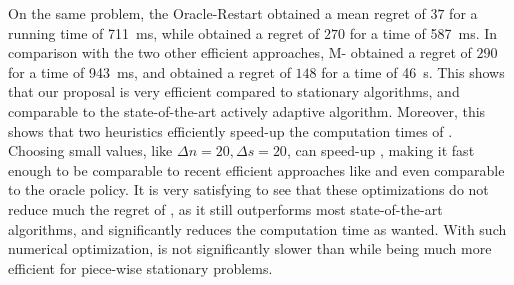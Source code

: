 On the same problem,
the Oracle-Restart \klUCB{} obtained a mean regret of $37$ for a running time of \SI{711}{\milli\second},
while \klUCB{} obtained a regret of $270$ for a time of \SI{587}{\milli\second}.
In comparison with the two other efficient approaches, M-\klUCB{} obtained a regret of $290$ for a time of \SI{943}{\milli\second},
and \CUSUMklUCB{} obtained a regret of $148$ for a time of \SI{46}{\second}.
%
This shows that our proposal is very efficient compared to stationary algorithms, and comparable to the state-of-the-art actively adaptive algorithm.
Moreover, this shows that two heuristics efficiently speed-up the computation times of \GLRklUCB.
Choosing small values, like $\Delta n = 20, \Delta s = 20$, can speed-up \GLRklUCB, making it fast enough to be comparable to recent efficient approaches like \MUCB{} and even comparable to the oracle policy.
%
It is very satisfying to see that these optimizations do not reduce much the regret of \GLRklUCB, as it still outperforms most state-of-the-art algorithms, and significantly reduces the computation time as wanted.
With such numerical optimization, \GLRklUCB{} is not significantly slower than \klUCB{} while being much more efficient for piece-wise stationary problems.

